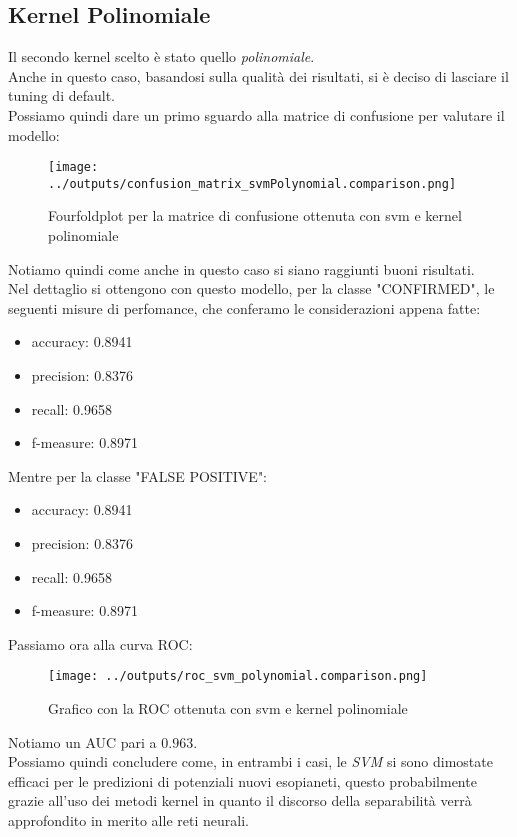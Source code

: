 \subsection{Kernel Polinomiale}
Il secondo kernel scelto è stato quello \textit{polinomiale}.\\
Anche in questo caso, basandosi sulla qualità dei risultati, si è deciso di
lasciare il tuning di default.\\
Possiamo quindi dare un primo sguardo alla matrice di confusione per valutare
il modello:
\begin{figure}[H]
    \centering
    \texttt{[image: ../outputs/confusion\_matrix\_svmPolynomial.comparison.png]}
    \caption{Fourfoldplot per la matrice di confusione ottenuta con svm e kernel polinomiale}
\end{figure}
Notiamo quindi come anche in questo caso si siano raggiunti buoni risultati.\\
Nel dettaglio si ottengono con questo modello,  per la classe "CONFIRMED", le 
seguenti misure di perfomance, che conferamo le considerazioni appena fatte:
\begin{itemize}
    \item accuracy: 0.8941 
    \item precision: 0.8376  
    \item recall: 0.9658 
    \item f-measure: 0.8971
\end{itemize}
Mentre per la classe "FALSE POSITIVE":
\begin{itemize}
    \item accuracy: 0.8941 
    \item precision: 0.8376  
    \item recall: 0.9658 
    \item f-measure: 0.8971
\end{itemize}
Passiamo ora alla curva ROC: 
\begin{figure}[H]
    \centering
    \texttt{[image: ../outputs/roc\_svm\_polynomial.comparison.png]}
    \caption{Grafico con la ROC ottenuta con svm e kernel polinomiale}
\end{figure}
Notiamo un AUC pari a $0.963$.\\
Possiamo quindi concludere come, in entrambi i casi, le \textit{SVM} si sono 
dimostate efficaci per le predizioni di potenziali nuovi esopianeti, questo 
probabilmente grazie all'uso dei metodi kernel in quanto il discorso della 
separabilità verrà approfondito in merito alle reti neurali.
